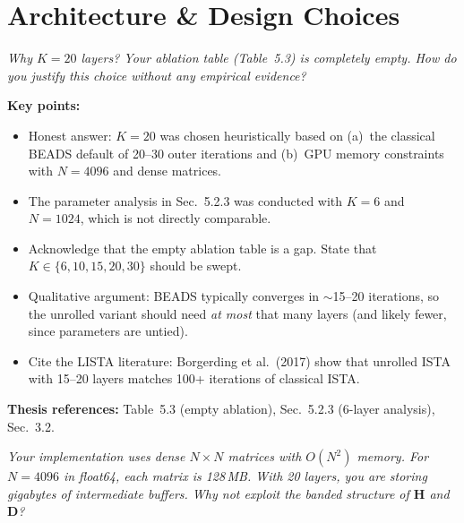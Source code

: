 \documentclass[11pt, letterpaper]{article}
\newcounter{qcounter}
\newcommand{\question}[1]{%
  \stepcounter{qcounter}%
  \begin{questionbox}[Q\theqcounter]%
    \itshape #1%
  \end{questionbox}%
}
\begin{document}
\section{Architecture \& Design Choices}

\question{Why $K{=}20$ layers?  Your ablation table (Table~5.3) is
completely empty.  How do you justify this choice without any
empirical evidence?}

\begin{answerbox}
\textbf{Key points:}
\begin{itemize}[nosep]
  \item Honest answer: $K{=}20$ was chosen heuristically based on
        (a)~the classical BEADS default of 20--30 outer iterations
        and (b)~GPU memory constraints with $N{=}4096$ and dense matrices.
  \item The parameter analysis in Sec.~5.2.3 was conducted with $K{=}6$
        and $N{=}1024$, which is not directly comparable.
  \item Acknowledge that the empty ablation table is a gap.
        State that $K \in \{6, 10, 15, 20, 30\}$ should be swept.
  \item Qualitative argument: BEADS typically converges in
        $\sim$15--20 iterations, so the unrolled variant should need
        \emph{at most} that many layers (and likely fewer, since
        parameters are untied).
  \item Cite the LISTA literature: Borgerding et al.\ (2017) show
        that unrolled ISTA with 15--20 layers matches 100+ iterations
        of classical ISTA.
\end{itemize}
\textbf{Thesis references:} Table~5.3 (empty ablation), Sec.~5.2.3 (6-layer analysis), Sec.~3.2.
\end{answerbox}

\question{Your implementation uses dense $N \times N$ matrices with
$O(N^2)$ memory.  For $N{=}4096$ in float64, each matrix is 128\,MB.
With 20 layers, you are storing gigabytes of intermediate buffers.
Why not exploit the banded structure of $\mathbf{H}$ and
$\mathbf{D}$?}
\end{document}
